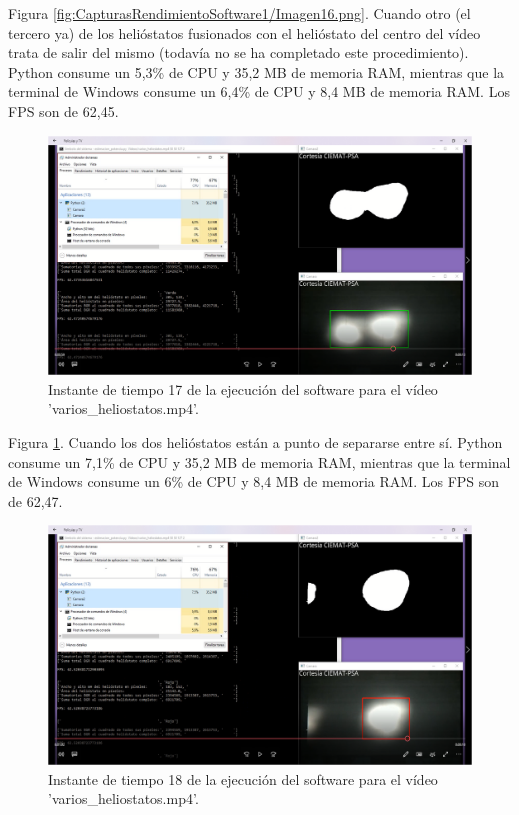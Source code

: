 Figura \ref{fig:CapturasRendimientoSoftware1/Imagen16.png}. Cuando otro (el tercero ya) de los helióstatos fusionados con el helióstato del centro del vídeo trata de salir del mismo (todavía no se ha completado este procedimiento). Python consume un 5,3\% de CPU y 35,2 MB de memoria RAM, mientras que la terminal de Windows consume un 6,4\% de CPU y 8,4 MB de memoria RAM. Los FPS son de 62,45.\\[20pt]

\begin{figure}[h!]
  	\centering
	\includegraphics[width=\textwidth]{CapturasRendimientoSoftware1/Imagen17.png}
	\caption{Instante de tiempo 17 de la ejecución del software para el vídeo 'varios\_heliostatos.mp4'.
	\label{fig:CapturasRendimientoSoftware1/Imagen17.png}}
\end{figure}

Figura \ref{fig:CapturasRendimientoSoftware1/Imagen17.png}. Cuando los dos helióstatos están a punto de separarse entre sí. Python consume un 7,1\% de CPU y 35,2 MB de memoria RAM, mientras que la terminal de Windows consume un 6\% de CPU y 8,4 MB de memoria RAM. Los FPS son de 62,47.\\[20pt]

\begin{figure}[h!]
  	\centering
	\includegraphics[width=\textwidth]{CapturasRendimientoSoftware1/Imagen18.png}
	\caption{Instante de tiempo 18 de la ejecución del software para el vídeo 'varios\_heliostatos.mp4'.
	\label{fig:CapturasRendimientoSoftware1/Imagen18.png}}
\end{figure}

